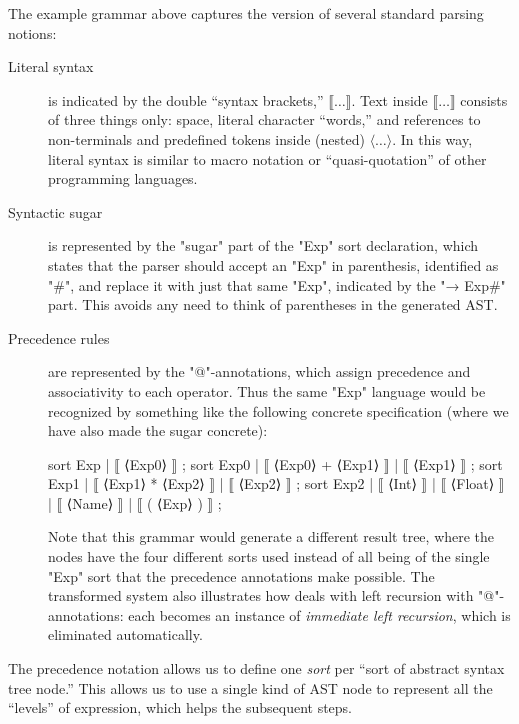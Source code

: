 \documentclass[11pt]{article} %
\begin{document}
The example grammar above captures the \HAX version of several standard parsing notions:
\begin{description}

\item[Literal syntax] is indicated by the double ``syntax brackets,'' $⟦…⟧$.  Text inside $⟦…⟧$
  consists of three things only: space, literal character ``words,'' and references to non-terminals
  and predefined tokens inside (nested) $⟨…⟩$.  In this way, literal syntax is similar to macro
  notation or ``quasi-quotation'' of other programming languages.

\item[Syntactic sugar] is represented by the "sugar" part of the "Exp" sort declaration, which
  states that the parser should accept an "Exp" in parenthesis, identified as "#", and replace it
  with just that same "Exp", indicated by the "→ Exp#" part.  This avoids any need to think of
  parentheses in the generated AST.

\item[Precedence rules] are represented by the "@"-annotations, which assign precedence and
  associativity to each operator. Thus the same "Exp" language would be recognized by
  something like the following concrete \HAX specification (where we have also made the sugar
  concrete):
\begin{hacs}[xleftmargin=\parindent]
sort Exp   | ⟦ ⟨Exp0⟩ ⟧ ;
sort Exp0  | ⟦ ⟨Exp0⟩ + ⟨Exp1⟩ ⟧ | ⟦ ⟨Exp1⟩ ⟧ ;
sort Exp1  | ⟦ ⟨Exp1⟩ * ⟨Exp2⟩ ⟧ | ⟦ ⟨Exp2⟩ ⟧ ;
sort Exp2  | ⟦ ⟨Int⟩ ⟧ | ⟦ ⟨Float⟩ ⟧ | ⟦ ⟨Name⟩ ⟧ | ⟦ ( ⟨Exp⟩ ) ⟧ ;
\end{hacs}%
  Note that this grammar would generate a different result tree, where the nodes have the four
  different sorts used instead of all being of the single "Exp" sort that the precedence
  annotations make possible.  The transformed system also illustrates how \HAX deals with left
  recursion with "@"-annotations: each becomes an instance of \emph{immediate left recursion},
  which is eliminated automatically.

\end{description}
The precedence notation allows us to define one \emph{sort} per ``sort of abstract syntax tree
node.''  This allows us to use a single kind of AST node to represent all the ``levels'' of
expression, which helps the subsequent steps.
\end{document}
